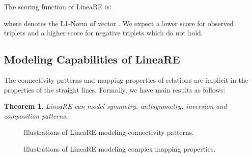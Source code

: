 \documentclass[conference]{IEEEtran}
\newtheorem{theorem}{Theorem}
\begin{document}
The scoring function of LineaRE is:

where  denotes the L1-Norm of vector . We expect a lower score for observed triplets and a higher score for negative triplets which do not hold.

\subsection{Modeling Capabilities of LineaRE} \label{Capabilities}
The connectivity patterns and mapping properties of relations are implicit in the properties of the straight lines. Formally, we have main results as follows:
\begin{theorem}
	LineaRE can model symmetry, antisymmetry, inversion and composition patterns.
\end{theorem}
\begin{figure*}[t]
	\centering
	\caption{
		Illustrations of LineaRE modeling connectivity patterns.
	}
	\label{Pattern}
\end{figure*}
\begin{figure}[t]
	\centering
	\caption{
		Illustrations of LineaRE modeling complex mapping properties.
	}
	\label{Mapping}
\end{figure}
\end{document}
